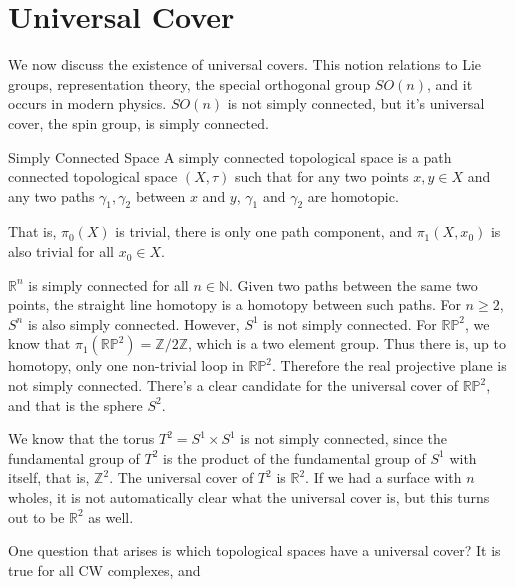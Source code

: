 \section{Universal Cover}
    We now discuss the existence of universal covers.
    This notion relations to Lie groups, representation theory,
    the special orthogonal group $SO(n)$, and it occurs
    in modern physics. $SO(n)$ is not simply connected, but
    it's universal cover, the spin group, is simply
    connected.
    \begin{ldefinition}{Simply Connected Space}
        A simply connected topological space is a path
        connected topological space $(X,\tau)$ such that
        for any two points $x,y\in{X}$ and any two paths
        $\gamma_{1},\gamma_{2}$ between $x$ and $y$,
        $\gamma_{1}$ and $\gamma_{2}$ are homotopic.
    \end{ldefinition}
    That is, $\pi_{0}(X)$ is trivial, there is only one
    path component, and $\pi_{1}(X,x_{0})$ is also
    trivial for all $x_{0}\in{X}$.
    \begin{example}
        $\mathbb{R}^{n}$ is simply connected for all
        $n\in\mathbb{N}$. Given two paths between the same
        two points, the straight line homotopy is a homotopy
        between such paths. For $n\geq{2}$, $S^{n}$ is
        also simply connected. However, $S^{1}$ is not
        simply connected. For $\mathbb{RP}^{2}$, we know
        that $\pi_{1}(\mathbb{RP}^{2})=\mathbb{Z}/2\mathbb{Z}$,
        which is a two element group. Thus there is, up to
        homotopy, only one non-trivial loop in
        $\mathbb{RP}^{2}$. Therefore the real projective plane
        is not simply connected. There's a clear candidate for
        the universal cover of $\mathbb{RP}^{2}$, and that is
        the sphere $S^{2}$.
    \end{example}
    \begin{example}
        We know that the torus $T^{2}=S^{1}\times{S}^{1}$ is
        not simply connected, since the fundamental group of
        $T^{2}$ is the product of the fundamental group
        of $S^{1}$ with itself, that is, $\mathbb{Z}^{2}$. The
        universal cover of $T^{2}$ is $\mathbb{R}^{2}$. If
        we had a surface with $n$ wholes, it is not
        automatically clear what the universal cover is, but
        this turns out to be $\mathbb{R}^{2}$ as well.
    \end{example}
    One question that arises is which topological spaces have
    a universal cover? It is true for all CW complexes, and

